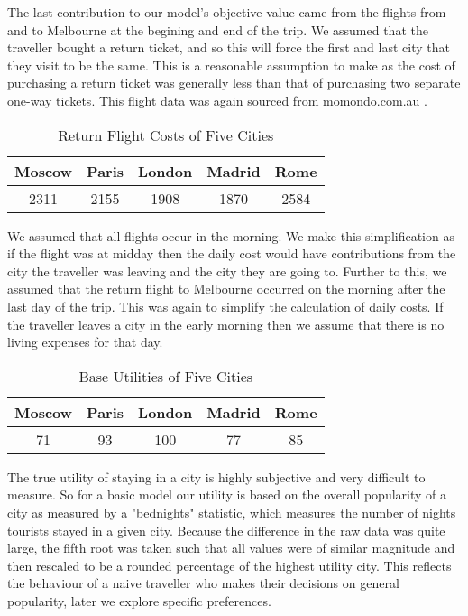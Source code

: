 \documentclass[12pt]{article}
\begin{document}
The last contribution to our model's objective value came from the flights from and to Melbourne at the begining and end of the trip. We assumed that the traveller bought a return ticket, and so this will force the first and last city that they visit to be the same. This is a reasonable assumption to make as the cost of purchasing a return ticket was generally less than that of purchasing two separate one-way tickets.  This flight data was again sourced from \url{momondo.com.au} \cite{momondo}.

\begin{table}[h]
\caption{Return Flight Costs of Five Cities}
\centering
\vspace{1mm}
\begin{tabular}{c|c|c|c|c}
\hline
\rule{0pt}{2ex} Moscow & Paris & London & Madrid & Rome \\
\hline
\rule{0pt}{2ex} 2311 & 2155 & 1908 & 1870 & 2584 \\

\end{tabular}
\end{table}

We assumed that all flights occur in the morning. We make this simplification as if the flight was at midday then the daily cost would have contributions from the city the traveller was leaving and the city they are going to. Further to this, we assumed that the return flight to Melbourne occurred on the morning after the last day of the trip. This was again to simplify the calculation of daily costs. If the traveller leaves a city in the early morning then we assume that there is no living expenses for that day.

\begin{table}[h]
\caption{Base Utilities of Five Cities}
\centering
\vspace{1mm}
\begin{tabular}{c|c|c|c|c}
\hline
\rule{0pt}{2ex} Moscow & Paris & London & Madrid & Rome \\
\hline
\rule{0pt}{2ex} 71 & 93 & 100 & 77 & 85 \\
\end{tabular}
\end{table}
The true utility of staying in a city is highly subjective and very difficult to measure. So for a basic model our utility is based on the overall popularity of a city as measured by a "bednights" statistic, which measures the number of nights tourists stayed in a given city. Because the difference in the raw data was quite large, the fifth root was taken such that all values were of similar magnitude and then rescaled to be a rounded percentage of the highest utility city. This reflects the behaviour of a naive traveller who makes their decisions on general popularity, later we explore specific preferences.
\end{document}
